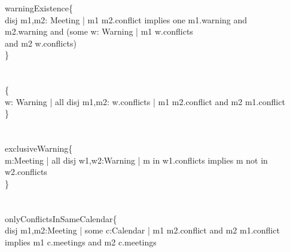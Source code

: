          warningExistence\{ \\
        \qquad \- disj m1,m2: Meeting | m1  m2.conflict {\color{blue}implies} one m1.warning and \\
        \qquad \-\qquad \-\qquad \-\qquad \-\qquad \-\qquad \- m2.warning and (some w: Warning | m1  w.conflicts\\
        \qquad \-\qquad \-\qquad \-\qquad \-\qquad \-\qquad \-\qquad \-\qquad \-\qquad \-\qquad \-\qquad \-\qquad \-\qquad  and m2  w.conflicts)\\
        \qquad \}\\
        \qquad \\
        \\
         \{\\
        \qquad \- w: Warning | {\color{blue}all} disj m1,m2: w.conflicts | m1  m2.conflict and m2  m1.conflict\\
        \qquad \}\\
        \qquad \\
        \\
         exclusiveWarning\{\\
        \qquad \- m:Meeting | {\color{blue}all} disj w1,w2:Warning | m {\color{blue}in} w1.conflicts {\color{blue}implies} m {\color{blue}not} in w2.conflicts\\
        \qquad \}\\
        \qquad \\
        \\
         onlyConflictsInSameCalendar\{ \\
        \qquad \- disj m1,m2:Meeting | {\color{blue}some} c:Calendar | m1  m2.conflict {\color{blue}and} m2  m1.conflict {\color{blue}implies} m1  c.meetings {\color{blue}and} m2  c.meetings\\
